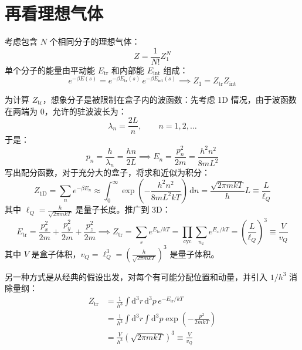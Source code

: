 \section{再看理想气体}
考虑包含 $N$ 个相同分子的理想气体：
\begin{equation}
    Z=\frac{1}{N!}Z_1^N
\end{equation}
单个分子的能量由平动能 $E_{\mathrm{tr}}$ 和内部能 $E_{\mathrm{int}}$ 组成：
\begin{equation}
    e^{-\beta E(s)}=e^{-\beta E_{\mathrm{tr}}(s)}\,e^{-\beta E_{\mathrm{int}}(s)}
    \implies
    Z_1=Z_{\mathrm{tr}}Z_{\mathrm{int}}
\end{equation}

为计算 $Z_{\mathrm{tr}}$，想象分子是被限制在盒子内的波函数：先考虑 1D 情况，由于波函数在两端为 0，允许的驻波波长为：
\begin{equation}
    \lambda_n=\frac{2L}{n},\qquad n=1,2,\dots
\end{equation}
于是：
\begin{equation}
    p_n=\frac{h}{\lambda_n}=\frac{hn}{2L} \implies E_n=\frac{p_n^2}{2m}=\frac{h^2n^2}{8mL^2}
\end{equation}
写出配分函数，对于充分大的盒子，将求和近似为积分：
\begin{equation}
    Z_{1\mathrm{D}}=\sum_n e^{-\beta E_n}
    \approx\int_0^{\infty}\exp\!\left(-\frac{h^2n^2}{8mL^2kT}\right)\,\mathrm{d}n
    =\frac{\sqrt{2\pi mkT}}{h}L
    \equiv\frac{L}{\ell_Q}
\end{equation}
其中 $\ell_Q=\frac{h}{\sqrt{2\pi mkT}}$ 是量子长度。推广到 3D：
\begin{equation}
    E_{\mathrm{tr}}=\frac{p_x^2}{2m}+\frac{p_y^2}{2m}+\frac{p_z^2}{2m} \implies Z_{\mathrm{tr}}=\sum_s e^{E_{\mathrm{tr}}/kT} = \prod_\mathrm{cyc} \sum_{n_x} e^{E_x/kT} =\left(\frac{L}{\ell_Q}\right)^3 \equiv \frac{V}{v_Q}
\end{equation}
其中 $V$ 是盒子体积，$v_Q=\ell_Q^3=\left(\frac{h}{\sqrt{2\pi mkT}}\right)^3$ 是量子体积。

另一种方式是从经典的假设出发，对每个有可能分配位置和动量，并引入 $1/h^3$ 消除量纲：
\begin{equation}
    \begin{split}
        Z_{\mathrm{tr}}
        &=\frac{1}{h^3}\int \mathrm{d}^3r\,\mathrm{d}^3p\,e^{-E_{\mathrm{tr}}/kT}\\
        &=\frac{1}{h^3}\int \mathrm{d}^3r\int \mathrm{d}^3p\exp\!\left(-\frac{p^2}{2mkT}\right)\\
        &=\frac{V}{h^3}\left(\sqrt{2\pi mkT}\right)^3
        \equiv \frac{V}{v_Q}  
    \end{split}
\end{equation}

